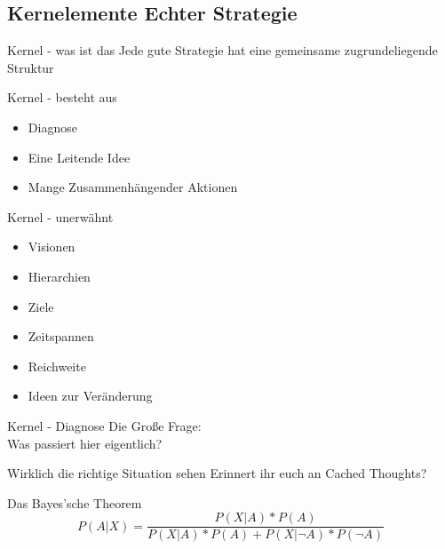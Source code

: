 

\subsection{Kernelemente Echter Strategie}


\begin{frame}[c]{Kernel - was ist das}
    \Large
    Jede gute Strategie hat eine gemeinsame zugrundeliegende Struktur
\end{frame}


\begin{frame}[c]{Kernel - besteht aus}
    \Large
    \begin{itemize}
        \item Diagnose
        \item Eine Leitende Idee
        \item Mange Zusammenhängender Aktionen
    \end{itemize}
\end{frame}


\begin{frame}[c]{Kernel - unerwähnt}
    \begin{itemize}
        \item Visionen
        \item Hierarchien
            \pause
        \item Ziele
        \item Zeitspannen
            \pause
        \item Reichweite
        \item Ideen zur Veränderung
    \end{itemize}
\end{frame}


\begin{frame}[c]{Kernel - Diagnose}
    \Huge
    Die Große Frage: \\
    \pause
    Was passiert hier eigentlich?
\end{frame}


\begin{frame}[c]{Wirklich die richtige Situation sehen}
    \Huge
    Erinnert ihr euch an Cached Thoughts?
\end{frame}


\begin{frame}[c]{Das Bayes'sche Theorem}
    \Large
    \[
        P(A|X) = \frac{P(X|A) * P(A)}{P(X|A) * P(A) + P(X|\neg A) * P(\neg A)}
    \]
\end{frame}


